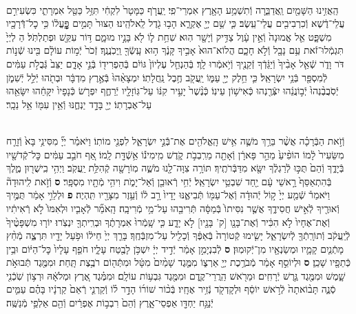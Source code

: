 \documentclass[twoside, openany, parskip=half, 11pt]{book}
\begin{document}
\begin{sometimes}
\begin{footnotesize}
\begin{multicols}{2}
\\
הַֽאֲזִ֥ינוּ הַשָּׁמַ֖יִם וַֽאֲדַבֵּ֑רָה וְֿתִשְׁמַ֥ע הָאָ֖רֶץ אִמְרֵי־פִֽי׃
יַֽעֲרֹ֤ף כַּמָּטָר֙ לִקְחִ֔י תִּזַּ֥ל כַּטַּ֖ל אִמְרָתִ֑י
כִּשְׂעִירִ֣ם עֲלֵי־דֶ֔שֶׁא וְֿכִרְבִיבִ֖ים עֲלֵי־עֵֽשֶׂב׃
כִּ֛י שֵׁ֥ם יְיָ֖ אֶקְרָ֑א הָב֥וּ גֹ֖דֶל לֵֽאלֹהֵֽינוּ׃
הַצּוּר֙ תָּמִ֣ים פׇׇׇׇׇׇׇׇׇׇָּֽעֳל֔וֹ כִּ֥י כׇל־דְּֿֿרָכָ֖יו מִשְׁפָּ֑ט
אֵ֤ל אֱמוּנָה֙ וְֿאֵ֣ין עָ֔וֶל צַדִּ֥יק וְֿיָשָׁ֖ר הֽוּא׃
שִׁחֵ֥ת ל֛וֹ לֹ֖א בָּנָ֣יו מוּמָ֑ם דּ֥וֹר עִקֵּ֖שׁ וּפְתַלְתֹּֽל׃
הַ לְיְיָ֙ תִּגְמְֿלוּ־זֹ֔את עַ֥ם נָבָ֖ל וְֿלֹ֣א חָכָ֑ם
הֲלוֹא־הוּא֙ אָבִ֣יךָ קָּנֶ֔ךָ ה֥וּא עָֽשְֿׂךָ֖ וַֽיְכֹֽנֲנֶֽךָ׃
זְֿכֹר֙ יְֿמ֣וֹת עוֹלָ֔ם בִּ֖ינוּ שְֿׁנ֣וֹת דֹּר וָדֹ֑ר
שְֿׁאַ֤ל אָבִ֨יךָ֙ וְֿיַגֵּ֔דְֿךָ זְֿקֵנֶ֖יךָ וְֿיֹ֥אמְֿרוּ לָֽךְ׃
בְּֿהַנְחֵ֤ל עֶלְיוֹן֙ גּוֹיִ֔ם בְּֿהַפְרִיד֖וֹ בְּֿנֵ֣י אָדָ֑ם
יַצֵּב֙ גְּֿבֻלֹ֣ת עַמִּ֔ים לְֿמִסְפַּ֖ר בְּֿנֵ֥י יִשְׂרָאֵֽל׃
כִּ֛י חֵ֥לֶק יְיָ֖ עַמּ֑וֹ יַֽעֲקֹ֖ב חֶ֥בֶל נַֽחֲלָתֽוֹ׃
יִמְצָאֵ֨הוּ֙ בְּֿאֶ֣רֶץ מִדְבָּ֔ר וּבְתֹ֖הוּ יְֿלֵ֣ל יְֿשִׁמֹ֑ן
יְֿסֹֽבֲבֶ֨נְהוּ֙ יְֿב֣וֹנֲנֵ֔הוּ יִצְּֿרֶ֖נְהוּ כְּֿאִישׁ֥וֹן עֵינֽוֹ׃
כְּֿנֶ֨שֶׁר֙ יָעִ֣יר קִנּ֔וֹ עַל־גּֽוֹזָלָ֖יו יְֿרַחֶ֑ף
יִפְרֹ֤שׂ כְּֿנָפָיו֙ יִקָּחֵ֔הוּ יִשָּׂאֵ֖הוּ עַל־אֶבְרָתֽוֹ׃
יְיָ֖ בָּדָ֣ד יַנְחֶ֑נּוּ וְֿאֵ֥ין עִמּ֖וֹ אֵ֥ל נֵכָֽר׃

\\
וְֿזֹ֣את הַבְּֿרָכָ֗ה אֲשֶׁ֨ר בֵּרַ֥ךְ מֹשֶׁ֛ה אִ֥ישׁ הָֽאֱלֹהִ֖ים אֶת־בְּֿֿנֵ֣י יִשְׂרָאֵ֑ל לִפְנֵ֖י מוֹתֽוֹ׃ וַיֹּאמַ֗ר יְיָ֞ מִסִּינַ֥י בָּא֙ וְֿזָרַ֤ח מִשֵּׂעִיר֙ לָ֔מוֹ הוֹפִ֨יעַ֙ מֵהַ֣ר פָּארָ֔ן וְֿאָתָ֖ה מֵרִֽבְבֹ֣ת קֹ֑דֶשׁ מִֽימִינ֕וֹ אֵ֥שְֿׁדָּ֖ת לָֽמוֹ׃ אַ֚ף חֹבֵ֣ב עַמִּ֔ים כׇּל־קְֿדֹשָׁ֖יו בְּֿיָדֶ֑ךָ וְֿהֵם֙ תֻּכּ֣וּ לְֿרַגְלֶ֔ךָ יִשָּׂ֖א מִדַּבְּֿרֹתֶֽיךָ׃ תּוֹרָ֥ה צִוָּה־לָ֖נוּ מֹשֶׁ֑ה מֽוֹרָשָׁ֖ה קְֿהִלַּ֥ת יַֽעֲקֹֽב׃ וַיְהִ֥י בִֽישֻׁר֖וּן מֶ֑לֶךְ בְּֿהִתְאַסֵּף֙ רָ֣אשֵׁי עָ֔ם יַ֖חַד שִׁבְטֵ֥י יִשְׂרָאֵֽל׃ יְֿחִ֥י רְֿאוּבֵ֖ן וְֿאַל־יָמֹ֑ת וִיהִ֥י מְֿתָ֖יו מִסְפָּֽר׃ \textbf{ס} וְֿזֹ֣את לִֽיהוּדָה֘ וַיֹּאמַר֒ שְֿׁמַ֤ע יְיָ֙ ק֣וֹל יְֿהוּדָ֔ה וְֿאֶל־עַמּ֖וֹ תְּֿבִיאֶ֑נּוּ יָדָיו֙ רָ֣ב ל֔וֹ וְֿעֵ֥זֶר מִצָּרָ֖יו תִּֽהְיֶה׃ \textbf{פ}
וּלְלֵוִ֣י אָמַ֔ר תֻּמֶּ֥יךָ וְֿאוּרֶ֖יךָ לְֿאִ֣ישׁ חֲסִידֶ֑ךָ אֲשֶׁ֤ר נִסִּיתוֹ֙ בְּֿמַסָּ֔ה תְּֿרִיבֵ֖הוּ עַל־מֵ֥י מְֿרִיבָֽה׃ הָֽאֹמֵ֞ר לְֿאָבִ֤יו וּלְאִמּוֹ֙ לֹ֣א רְֿאִיתִ֔יו וְֿאֶת־אֶחָיו֙ לֹ֣א הִכִּ֔יר וְֿאֶת־בָּנָ֖ו [ק' בָּנָ֖יו] לֹ֣א יָדָ֑ע כִּ֤י שָֽׁמְֿרוּ֙ אִמְרָתֶ֔ךָ וּבְרִֽיתְךָ֖ יִנְצֹֽרוּ׃ יוֹר֤וּ מִשְׁפָּטֶ֨יךָ֙ לְֿיַֽעֲקֹ֔ב וְֿתוֹרָֽתְֿךָ֖ לְֿיִשְׂרָאֵ֑ל יָשִׂ֤ימוּ קְֿטוֹרָה֙ בְּֿאַפֶּ֔ךָ וְֿכָלִ֖יל עַל־מִזְבְּֿחֶֽךָ׃ בָּרֵ֤ךְ יְיָ֙ חֵיל֔וֹ וּפֹ֥עַל יָדָ֖יו תִּרְצֶ֑ה מְֿחַ֨ץ מָתְֿנַ֧יִם קָמָ֛יו וּמְשַׂנְאָ֖יו מִן־יְֿקוּמֽוּן׃ \textbf{ס} לְֿבִנְיָמִ֣ן אָמַ֔ר יְֿדִ֣יד יְיָ֔ יִשְׁכֹּ֥ן לָבֶ֖טַח עָלָ֑יו חֹפֵ֤ף עָלָיו֙ כׇּל־הַיּ֔וֹם וּבֵ֥ין כְּֿתֵפָ֖יו שָׁכֵֽן׃ \textbf{ס}
וּלְיוֹסֵ֣ף אָמַ֔ר מְֿבֹרֶ֥כֶת יְיָ֖ אַרְצ֑וֹ מִמֶּ֤גֶד שָׁמַ֨יִם֙ מִטָּ֔ל וּמִתְּֿה֖וֹם רֹבֶ֥צֶת תָּֽחַת׃ וּמִמֶּ֖גֶד תְּֿבוּאֹ֣ת שָׁ֑מֶשׁ וּמִמֶּ֖גֶד גֶּ֥רֶשׁ יְֿרָחִֽים׃ וּמֵרֹ֖אשׁ הַֽרֲרֵי־קֶ֑דֶם וּמִמֶּ֖גֶד גִּבְע֥וֹת עוֹלָֽם׃ וּמִמֶּ֗גֶד אֶ֚רֶץ וּמְלֹאָ֔הּ וּרְצ֥וֹן שֹֽׁכְֿנִ֖י סְֿנֶ֑ה תָּב֨וֹאתָה֙ לְֿרֹ֣אשׁ יוֹסֵ֔ף וּלְקָדְקֹ֖ד נְֿזִ֥יר אֶחָֽיו׃ בְּֿכ֨וֹר שׁוֹר֜וֹ הָדָ֣ר ל֗וֹ וְֿקַרְנֵ֤י רְֿאֵם֙ קַרְנָ֔יו בָּהֶ֗ם עַמִּ֛ים יְֿנַגַּ֥ח יַחְדָּ֖ו אַפְסֵי־אָ֑רֶץ וְֿהֵם֙ רִבְב֣וֹת אֶפְרַ֔יִם וְֿהֵ֖ם אַלְפֵ֥י מְֿנַשֶּֽׁה׃


\end{multicols}
\end{footnotesize}
\end{sometimes}
\end{document}
